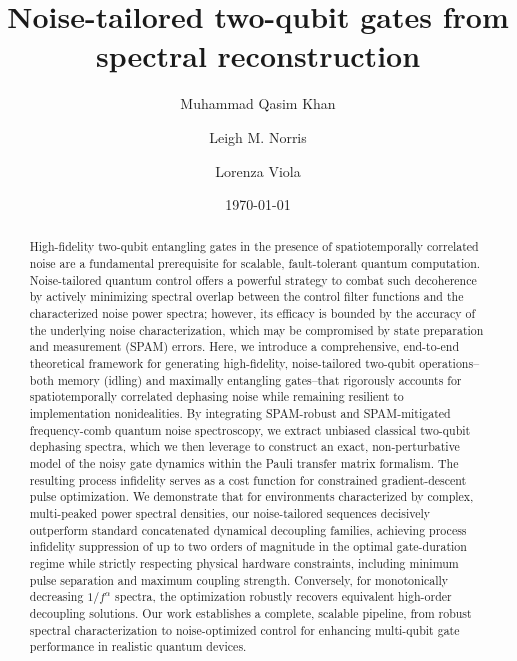 \documentclass[%
 reprint,
superscriptaddress,
 amsmath,amssymb,
 aps,
pra,
]{revtex4-2}
\begin{document}
\title{Noise-tailored two-qubit gates 
from spectral reconstruction}

\author{Muhammad Qasim Khan}

\author{Leigh M. Norris}

\author{Lorenza Viola}


\date{\today}%

\begin{abstract}
High-fidelity two-qubit entangling gates in the presence of spatiotemporally correlated noise are a fundamental prerequisite for scalable, fault-tolerant quantum computation. Noise-tailored quantum control offers a powerful strategy to combat such decoherence by actively minimizing spectral overlap between the control filter functions and the characterized noise power spectra; however, its efficacy is bounded by the accuracy of the underlying noise characterization, which may be compromised by state preparation and measurement (SPAM) errors. Here, we introduce a comprehensive, end-to-end theoretical framework for generating high-fidelity, noise-tailored two-qubit operations--both memory (idling) and maximally entangling gates--that rigorously accounts for spatiotemporally correlated dephasing noise while remaining resilient to implementation nonidealities. By integrating SPAM-robust and SPAM-mitigated frequency-comb quantum noise spectroscopy, we extract unbiased classical two-qubit dephasing spectra, which we then leverage to construct an exact, non-perturbative model of the noisy gate dynamics within the Pauli transfer matrix formalism. The resulting process infidelity serves as a cost function for constrained gradient-descent pulse optimization. We demonstrate that for environments characterized by complex, multi-peaked power spectral densities, our noise-tailored sequences decisively outperform standard concatenated dynamical decoupling families, achieving process infidelity suppression of up to two orders of magnitude in the optimal gate-duration regime while strictly respecting physical hardware constraints, including minimum pulse separation and maximum coupling strength. Conversely, for monotonically decreasing $1/f^\alpha$ spectra, the optimization robustly recovers equivalent high-order decoupling solutions. Our work establishes a complete, scalable pipeline, from robust spectral characterization to noise-optimized control for enhancing multi-qubit gate performance in realistic quantum devices.
\end{abstract}
\end{document}
